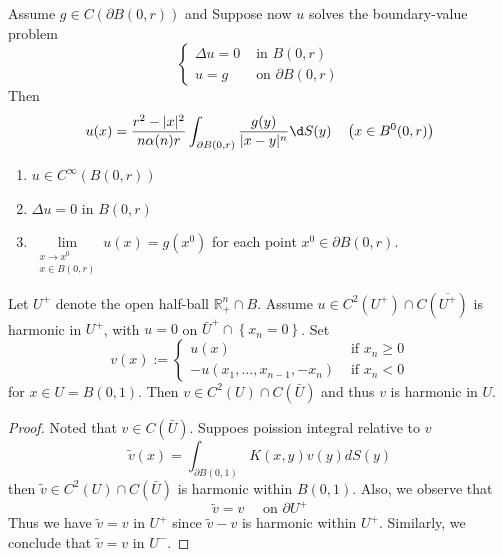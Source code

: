 \begin{theorem}
    Assume $g \in C(\partial B(0, r))$ and Suppose now $u$ solves the boundary-value problem
    \begin{equation*}
        \left\{
        \begin{aligned}
            \Delta u=0 & \text { in } B(0, r)          \\
            u=g        & \text { on } \partial B(0, r)
        \end{aligned}
        \right.
    \end{equation*}
    Then
    \begin{equation*}
        u(x)
        =
        \frac{r^2-|x|^2}{n \alpha(n) r} \int_{\partial B(0, r)} \frac{g(y)}{|x-y|^n} \d S(y) \quad\left(x \in B^0(0, r)\right)
    \end{equation*}
    \begin{enumerate}
        \item
              $u \in C^{\infty}\left(B(0, r)\right)$

        \item   $\Delta u=0 $ in $B(0, r)$

        \item   $\lim\limits_{\substack{x \rightarrow x^0 \\ x \in B(0, r)}} u(x)=g\left(x^0\right)$ for each point $x^0 \in \partial B(0, r)$.
    \end{enumerate}
\end{theorem}

\begin{theorem}
    Let $U^{+}$ denote the open half-ball
    $\mathbb{R}^n_+ \cap B$.
    Assume $u \in C^2\left(U^{+}\right) \cap C\left(\overline{U^{+}}\right)$ is harmonic in $U^{+}$, with $u=0$ on $\bar{U}^+ \cap \left\{x_n=0\right\}$. Set
    \begin{equation*}
        v(x):= \begin{cases}u(x) & \text { if } x_n \geq 0 \\ -u\left(x_1, \ldots, x_{n-1},-x_n\right) & \text { if } x_n<0\end{cases}
    \end{equation*}
    for $x \in U=B(0,1)$. Then $v \in C^2(U)\cap C(\bar{U})$ and thus $v$ is harmonic in $U$.
    \begin{proof}
        Noted that $v\in C(\bar{U})$. Suppoes poission integral relative to $v$
        \begin{equation*}
            \tilde{v}(x)= \int_{\partial B(0,1)} K(x,y) v(y) dS(y)
        \end{equation*}
        then $\tilde{v} \in C^2(U)\cap C(\bar{U})$ is harmonic within $B(0,1)$. Also, we observe that
        \begin{equation*}
            \tilde{v}= v \quad \text{ on } \partial U^+
        \end{equation*}
        Thus we have $\tilde{v} = v$ in $U^+$ since $\tilde{v}-v$ is harmonic within $U^+$. Similarly, we conclude that $\tilde{v} =v$ in $U^-$.
    \end{proof}
\end{theorem}
